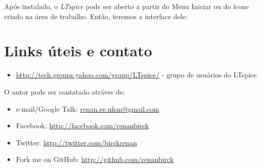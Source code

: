 \documentclass[]{book}
\begin{document}
Após instalado, o \textit{LTspice} pode ser aberto a partir do Menu Iniciar ou do ícone criado na área de trabalho. Então, teremos a interface dele:



\chapter{Links úteis e contato}
\begin{itemize}
\item \url{http://tech.groups.yahoo.com/group/LTspice/} - grupo de usuários do LTspice
\end{itemize}

O autor pode ser contatado atráves de:

\begin{itemize}
\item e-mail/Google Talk: \url{renan.ee.ufsm@gmail.com}
\item Facebook: \url{http://facebook.com/renanbirck}
\item Twitter: \url{http://twitter.com/birckrenan}
\item Fork me on GitHub: \url{http://github.com/renanbirck}
\end{itemize}



\end{document}
